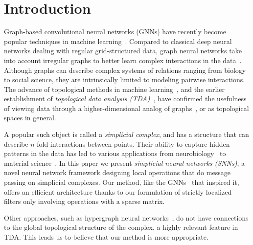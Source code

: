 \section{Introduction}



Graph-based convolutional neural networks (GNNs) have recently become popular techniques in machine learning~\cite{defferrard2016convolutional, bronstein2017geometric, wu2020survey}. Compared to classical deep neural networks dealing with regular grid-structured data, graph neural networks take into account irregular graphs to better learn complex interactions in the data~\cite{battaglia2018relational}. Although graphs can describe complex systems of relations ranging from biology to social science, they are intrinsically limited to modeling pairwise interactions. The advance of topological methods in machine learning~\cite{Gabrielsson2020topological, Hofer2019LearningRO, rieck2018neural}, and the earlier establishment of \emph{topological data analysis (TDA)}~\cite{carlsson2008,chazal2017,edelsbrunner2010computational,ghrist2008barcodes}, have confirmed the usefulness of viewing data through a higher-dimensional analog of graphs~\cite{moore2012,patania2017}, or as topological spaces in general.

A popular such object is called a \emph{simplicial complex}, and has a structure that can describe $n$-fold interactions between points. Their ability to capture hidden patterns in the data has led to various applications from neurobiology~\cite{giusti2015,reimann2017} to material science~\cite{hiraoka2016}. In this paper we present \textit{simplicial neural networks (SNNs)}, a novel neural network framework designing local operations that do message passing on simplicial complexes.
Our method, like the GNNs~\cite{defferrard2016convolutional} that inspired it, offers an efficient architecture thanks to our formulation of strictly localized filters only involving operations with a sparse matrix.

Other approaches, such as hypergraph neural networks~\cite{feng2018hypergraphs}, do not have connections to the global topological structure of the complex, a highly relevant feature in TDA. This leads us to believe that our method is more appropriate.
